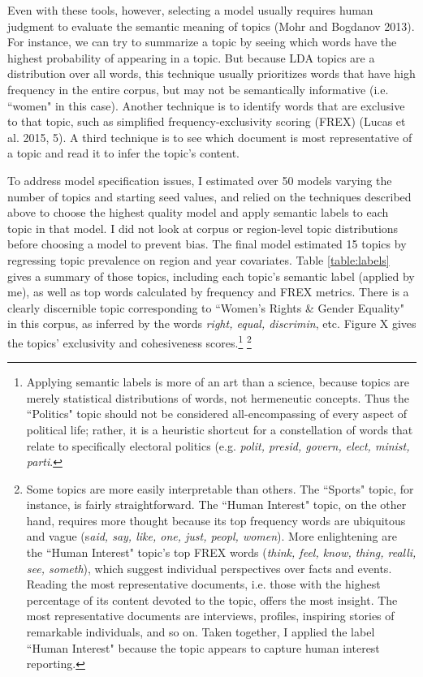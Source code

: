 \documentclass[11pt, oneside]{article}
\begin{document}
Even with these tools, however, selecting a model usually requires human judgment to evaluate the semantic meaning of topics (Mohr and Bogdanov 2013). For instance, we can try to summarize a topic by seeing which words have the highest probability of appearing in a topic. But because LDA topics are a distribution over all words, this technique usually prioritizes words that have high frequency in the entire corpus, but may not be semantically informative (i.e. ``women" in this case). Another technique is to identify words that are exclusive to that topic, such as simplified frequency-exclusivity scoring (FREX) (Lucas et al. 2015, 5). A third technique is to see which document is most representative of a topic and read it to infer the topic's content.

To address model specification issues, I estimated over 50 models varying the number of topics and starting seed values, and relied on the techniques described above to choose the highest quality model and apply semantic labels to each topic in that model. I did not look at corpus or region-level topic distributions before choosing a model to prevent bias. The final model estimated 15 topics by regressing topic prevalence on region and year covariates. Table \ref{table:labels} gives a summary of those topics, including each topic's semantic label (applied by me), as well as top words calculated by frequency and FREX metrics. There is a clearly discernible topic corresponding to ``Women's Rights \& Gender Equality" in this corpus, as inferred by the words \emph{right, equal, discrimin}, etc. Figure X gives the topics' exclusivity and cohesiveness scores.\footnote{\hspace{5} Applying semantic labels is more of an art than a science, because topics are merely statistical distributions of words, not hermeneutic concepts. Thus the ``Politics" topic should not be considered all-encompassing of every aspect of political life; rather, it is a heuristic shortcut for a constellation of words that relate to specifically electoral politics (e.g. \emph{polit, presid, govern, elect, minist, parti}.} \footnote{\hspace{5} Some topics are more easily interpretable than others. The ``Sports" topic, for instance, is fairly straightforward. The ``Human Interest" topic, on the other hand, requires more thought because its top frequency words are ubiquitous and vague (s\emph{aid, say, like, one, just, peopl, women}). More enlightening are the ``Human Interest" topic's top FREX words (\emph{think, feel, know, thing, realli, see, someth}), which suggest individual perspectives over facts and events. Reading the most representative documents, i.e. those with the highest percentage of its content devoted to the topic, offers the most insight. The most representative documents are interviews, profiles, inspiring stories of remarkable individuals, and so on. Taken together, I applied the label ``Human Interest" because the topic appears to capture human interest reporting.}
\end{document}
